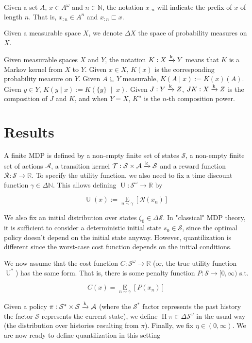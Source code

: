 \documentclass[a4paper]{article}
\newcommand{\AP}[1]{\left(#1\right)}
\newcommand{\AB}[1]{\left[#1\right]}
\newcommand{\APM}[2]{\left(#1\;\middle\vert\;#2\right)}
\newcommand{\Ea}[2]{\underset{#1}{\operatorname{E}}\AB{#2}}
\newcommand{\Nats}{\mathbb{N}}
\newcommand{\Reals}{\mathbb{R}}
\newcommand{\K}{\xrightarrow{\textnormal{k}}}
\newcommand{\A}{\mathcal{A}}
\newcommand{\St}{\mathcal{S}}
\newcommand{\T}{\mathcal{T}}
\newcommand{\R}{\mathcal{R}}
\newcommand{\Pe}{P}
\newcommand{\Ut}{\operatorname{U}}
\newcommand{\Co}{C}
\DeclareMathOperator{\Hi}{H}
\begin{document}
Given a set $A$, $x\in A^\omega$ and $n\in\Nats$, the notation $x_{:n}$ will indicate the prefix of $x$ of length $n$. That is, $x_{:n} \in A^n$ and $x_{:n} \sqsubset x$.

Given a measurable space $X$, we denote $\Delta X$ the space of probability measures on $X$.

Given measurable spaces $X$ and $Y$, the notation $K: X \K Y$ means that $K$ is a Markov kernel from $X$ to $Y$. Given $x \in X$, $K(x)$ is the corresponding probability measure on $Y$. Given $A \subseteq Y$ measurable, $K(A \mid x) := K(x)(A)$. Given $y \in Y$, $K(y \mid x):=K\APM{\{y\}}{x}$. Given $J: Y \K Z$, $JK: X \K Z$ is the composition of $J$ and $K$, and when $Y = X$, $K^n$ is the $n$-th composition power.

\section{Results}

A finite MDP is defined by a non-empty finite set of states $\St$, a non-empty finite set of actions $\A$, a transition kernel $\T: \St \times \A \K \St$ and a reward function $\R: \St \rightarrow \Reals$. To specify the utility function, we also need to fix a time discount function $\gamma \in \Delta\Nats$. This allows defining $\Ut: \St^\omega \rightarrow \Reals$ by

$$\Ut(x):=\Ea{n\sim\gamma}{\R\AP{x_n}}$$

We also fix an initial distribution over states $\zeta_0 \in \Delta \St$. In "classical" MDP theory, it is sufficient to consider a deterministic initial state $s_0 \in \St$, since the optimal policy doesn't depend on the initial state anyway. However, quantilization is different since the worst-case cost function depends on the initial conditions.

We now assume that the cost function $\Co: \St^\omega \rightarrow \Reals$ (or, the true utility function $\Ut^*$) has the same form. That is, there is some penalty function $\Pe: \St \rightarrow [0,\infty)$ s.t.

$$\Co(x) = \Ea{n\sim\gamma}{\Pe\AP{x_n}}$$

Given a policy $\pi: \St^*\times\St \K \A$ (where the $\St^*$ factor represents the past history the factor $\St$ represents the current state), we define $\Hi{\pi} \in \Delta\St^\omega$ in the usual way (the distribution over histories resulting from $\pi$). Finally, we fix $\eta \in (0,\infty)$. We are now ready to define quantilization in this setting
\end{document}
